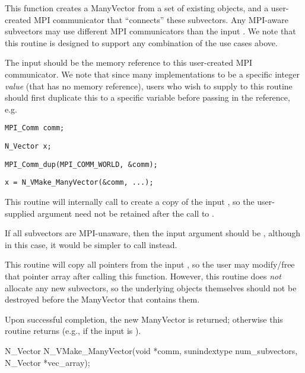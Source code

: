 {
  This function creates a ManyVector from a set of existing {\nvector}
  objects, and a user-created MPI communicator that ``connects'' these
  subvectors.  Any MPI-aware subvectors may use different MPI
  communicators than the input .  We note that this routine
  is designed to support any combination of the use cases above.

  The input  should be the memory reference to this
  user-created MPI communicator.  We note that since many {\mpi}
  implementations   to be a specific
  integer \emph{value} (that has no memory reference), users who wish
  to supply  to this routine should first
  duplicate this to a specific  variable before passing
  in the reference, e.g.

  \hspace{0.5in} \texttt{MPI\_Comm comm;}\vspace{-0.5em}
  
  \hspace{0.5in} \texttt{N\_Vector x;}\vspace{-0.5em}
  
  \hspace{0.5in} \texttt{MPI\_Comm\_dup(MPI\_COMM\_WORLD, \&comm);}\vspace{-0.5em}
  
  \hspace{0.5in} \texttt{x = N\_VMake\_ManyVector(\&comm, ...);}

  This routine will internally call  to create a
  copy of the input , so the user-supplied  argument
  need not be retained after the call to .

  If all subvectors are MPI-unaware, then the input  argument
  should be , although in this case, it would be simpler to
  call  instead.
  
  This routine will copy all  pointers from the input
  , so the user may modify/free that pointer array
  after calling this function.  However, this routine does \emph{not}
  allocate any new subvectors, so the underlying {\nvector} objects
  themselves should not be destroyed before the ManyVector that
  contains them.

  Upon successful completion, the new ManyVector is returned;
  otherwise this routine returns  (e.g., if the input
   is ).
}
{
  N\_Vector N\_VMake\_ManyVector(void *comm, 
  sunindextype num\_subvectors,
  N\_Vector *vec\_array);
}
